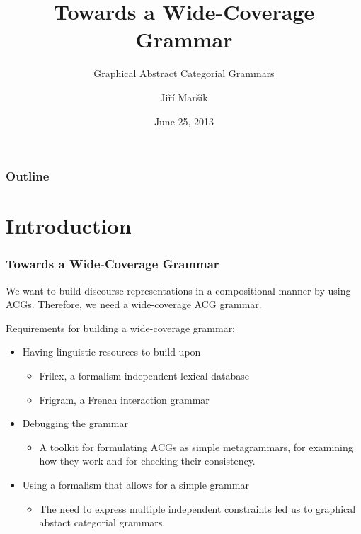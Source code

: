 \documentclass{beamer}
\begin{document}
\title[G-ACGs]{Towards a Wide-Coverage Grammar}
\subtitle{Graphical Abstract Categorial Grammars}
\author{Ji\v{r}\'{i} Mar\v{s}\'{i}k}
\date[June 2013]{June 25, 2013}

\frame{\titlepage}

\begin{frame}
\frametitle{Outline}
\tableofcontents
\end{frame}

\section{Introduction}

\begin{frame}
  \frametitle{Towards a Wide-Coverage Grammar}

  We want to build discourse representations in a compositional manner
  by using ACGs. Therefore, we need a wide-coverage ACG grammar.

  \vspace{3 mm}

  Requirements for building a wide-coverage grammar:
    \begin{itemize}
    \item Having linguistic resources to build upon
      \begin{itemize}
      \item Frilex, a formalism-independent lexical database
      \item Frigram, a French interaction grammar
      \end{itemize}
    \item Debugging the grammar
      \begin{itemize}
        \item A toolkit for formulating ACGs as simple metagrammars, for
          examining how they work and for checking their consistency.
      \end{itemize}
    \item Using a formalism that allows for a simple grammar
      \begin{itemize}
      \item The need to express multiple independent constraints led us
        to graphical abstact categorial grammars.
      \end{itemize}
    \end{itemize}
\end{frame}
\end{document}
